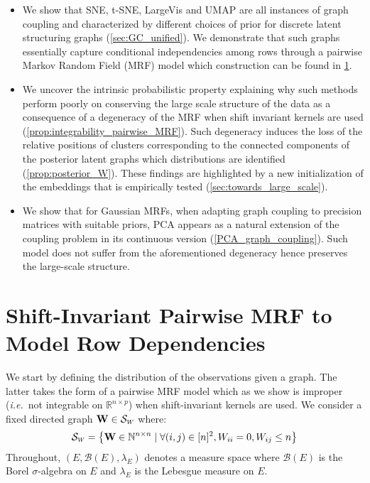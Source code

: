 \begin{itemize}
    \item We show that SNE, t-SNE, LargeVis and UMAP are all instances of graph coupling and characterized by different choices of prior for discrete latent structuring graphs (\cref{sec:GC_unified}). We demonstrate that such graphs essentially capture conditional independencies among rows through a pairwise Markov Random Field (MRF) model which construction can be found in \cref{sec:graph_structure}.
    \item We uncover the intrinsic probabilistic property explaining why such methods perform poorly on conserving the large scale structure of the data as a consequence of a degeneracy of the MRF when shift invariant kernels are used (\cref{prop:integrability_pairwise_MRF}). Such degeneracy induces the loss of the relative positions of clusters corresponding to the connected components of the posterior latent graphs which distributions are identified (\cref{prop:posterior_W}). These findings are highlighted by a new initialization of the embeddings that is empirically tested (\cref{sec:towards_large_scale}).
    \item We show that for Gaussian MRFs, when adapting  graph coupling to precision matrices with suitable priors, PCA appears as a natural extension of the coupling problem in its continuous version (\cref{PCA_graph_coupling}). Such model does not suffer from the aforementioned degeneracy hence preserves the large-scale structure.
\end{itemize}

\section {Shift-Invariant Pairwise MRF to Model Row Dependencies} \label{sec:graph_structure}

We start by defining the distribution of the observations given a graph. The latter takes the form of a pairwise MRF model which as we show is improper (\textit{i.e.}\ not integrable on $\mathbb{R}^{n \times p}$) when shift-invariant kernels are used. We consider a fixed directed graph $\W \in \mathcal{S}_{\scaleto{W}{4pt}}$ where:
$$\mathcal{S}_{\scaleto{W}{4pt}} = \left\{\W \in \mathbb{N}^{n \times n} \mid \forall (i,j) \in [n]^2, W_{ii}=0, W_{ij} \leq n \right\}$$
Throughout, $(E, \mathcal{B}(E), \lambda_E)$ denotes a measure space where $\mathcal{B}(E)$ is the Borel $\sigma$-algebra on $E$ and $\lambda_E$ is the Lebesgue measure on $E$.

